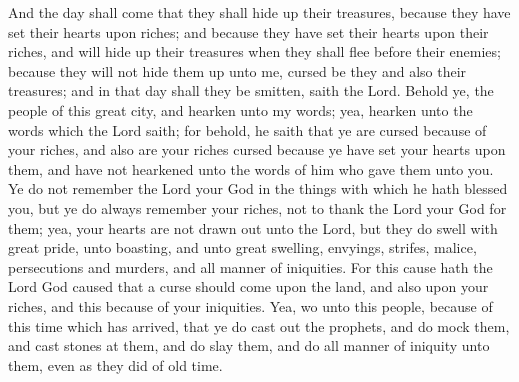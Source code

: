 And the day shall come that they shall hide up their treasures, because they have set their hearts upon riches; and because they have set their hearts upon their riches, and will hide up their treasures when they shall flee before their enemies; because they will not hide them up unto me, cursed be they and also their treasures; and in that day shall they be smitten, saith the Lord.
\bverse \iffalse Behold ye, the people of this great city, and hearken unto my words; yea, hearken unto the words which the Lord saith; for behold, he saith that ye are cursed because of your riches, and also are your riches cursed because ye have set your hearts upon them, and have not hearkened unto the words of him who gave them unto you. \fi
Behold ye, the people of this great city, and hearken unto my words; yea, hearken unto the words which the Lord saith; for behold, he saith that ye are cursed because of your riches, and also are your riches cursed because ye have set your hearts upon them, and have not hearkened unto the words of him who gave them unto you.
\bverse \iffalse Ye do not remember the Lord your God in the things with which he hath blessed you, but ye do always remember your riches, not to thank the Lord your God for them; yea, your hearts are not drawn out unto the Lord, but they do swell with great pride, unto boasting, and unto great swelling, envyings, strifes, malice, persecutions and murders, and all manner of iniquities. \fi
Ye do not remember the Lord your God in the things with which he hath blessed you, but ye do always remember your riches, not to thank the Lord your God for them; yea, your hearts are not drawn out unto the Lord, but they do swell with great pride, unto boasting, and unto great swelling, envyings, strifes, malice, persecutions and murders, and all manner of iniquities.
\bverse \iffalse For this cause hath the Lord God caused that a curse should come upon the land, and also upon your riches, and this because of your iniquities. \fi
For this cause hath the Lord God caused that a curse should come upon the land, and also upon your riches, and this because of your iniquities.
\bverse \iffalse Yea, wo unto this people, because of this time which has arrived, that ye do cast out the prophets, and do mock them, and cast stones at them, and do slay them, and do all manner of iniquity unto them, even as they did of old time. \fi
Yea, wo unto this people, because of this time which has arrived, that ye do cast out the prophets, and do mock them, and cast stones at them, and do slay them, and do all manner of iniquity unto them, even as they did of old time.
